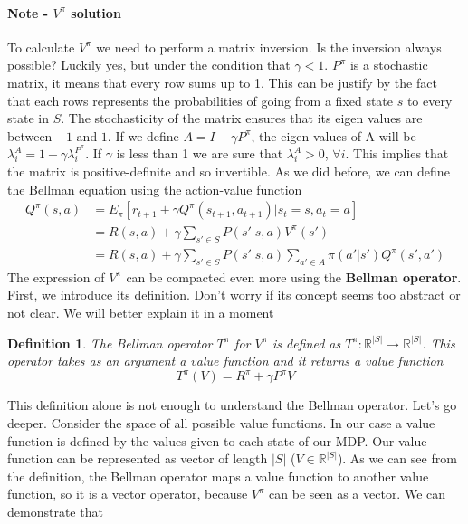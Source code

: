 \documentclass[main.tex]{subfiles}
\newtheorem{definition}{Definition}[section]
\begin{document}
\paragraph{Note - $V^{\pi}$ solution} To calculate $V^{\pi}$ we need to perform a matrix inversion. Is the inversion always possible? Luckily yes, but under the condition that $\gamma<1$. $P^{\pi}$ is a stochastic matrix, it means that every row sums up to 1. This can be justify by the fact that each rows represents the probabilities of going from a fixed state $s$ to every state in $S$. The stochasticity of the matrix ensures that its eigen values are between $-1$ and $1$. If we define $A = I - \gamma P^{\pi}$, the eigen values of A will be $\lambda_i^A = 1 - \gamma \lambda_i^{P^{\pi}}$. If $\gamma$ is less than 1 we are sure that $\lambda_i^A > 0$, $\forall i$. This implies that the matrix is positive-definite and so invertible.
\newline
\newline
As we did before, we can define the Bellman equation using the action-value function
\begin{align*}
    Q^{\pi}(s,a) &= E_{\pi}[r_{t+1} + \gamma Q^{\pi}(s_{t+1},a_{t+1})|s_t=s,a_t=a] \\
    &= R(s,a) + \gamma \sum_{s' \in S} P(s'|s,a)V^{\pi}(s') \\
    &= R(s,a) + \gamma \sum_{s' \in S} P(s'|s,a) \sum_{a' \in A} \pi(a'|s')Q^{\pi}(s',a')
\end{align*}
The expression of $V^{\pi}$ can be compacted even more using the \textbf{Bellman operator}.
First, we introduce its definition. Don't worry if its concept seems too abstract or not clear. We will better explain it in a moment
\begin{definition}
The Bellman operator $T^{\pi}$ for $V^{\pi}$ is defined as $T^{\pi}:\mathbb{R}^{|S|} \rightarrow \mathbb{R}^{|S|}$. This operator takes as an argument a value function and it returns a value function \footnotemark {}
\begin{equation*}
    T^{\pi}(V) = R^{\pi} + \gamma P^{\pi} V
\end{equation*}
\end{definition}
This definition alone is not enough to understand the Bellman operator. Let's go deeper. Consider the space of all possible value functions. In our case a value function is defined by the values given to each state of our MDP. Our value function can be represented as vector of length $|S|$ ($V \in \mathbb{R}^{|S|}$). As we can see from the definition, the Bellman operator maps a value function to another value function, so it is a vector operator, because $V^{\pi}$ can be seen as a vector. We can demonstrate that
\end{document}
